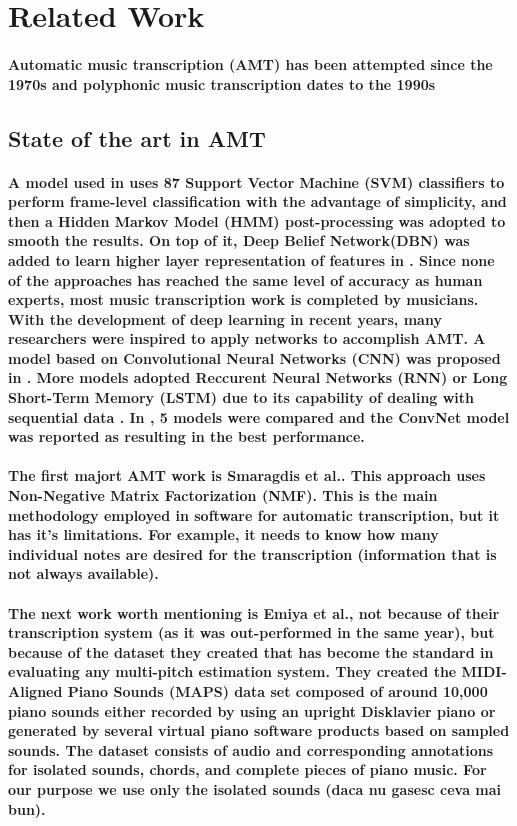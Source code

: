 \newpage
\section{Related Work}
\paragraph{
Automatic music transcription (AMT) has been attempted since the 1970s and polyphonic music transcription dates to the 1990s \cite{REF:1}
}

\subsection{State of the art in AMT}
\paragraph{
A model used in \cite{REF:2} uses 87 Support Vector Machine (SVM) classifiers to perform frame-level classification with the advantage of simplicity, and then a Hidden Markov Model (HMM) post-processing was adopted to smooth the results. On top of it, Deep Belief Network(DBN) was added to learn higher layer representation of features in \cite{REF:3}. Since none of the approaches has reached the same level of accuracy as human experts, most music transcription work is completed by musicians. With the development of deep learning in recent years, many researchers were inspired to apply networks to accomplish AMT. A model based on Convolutional Neural Networks (CNN) was proposed in \cite{REF:4}. More models adopted Reccurent Neural Networks (RNN) or Long Short-Term Memory (LSTM) due to its capability of dealing with sequential data \cite{REF:1} \cite{REF:5} \cite{REF:6}. In \cite{REF:7}, 5 models were compared and the ConvNet model was reported as resulting in the best performance.
}
\paragraph{
The first majort AMT work is Smaragdis et al.\cite{REF:8}. This approach uses Non-Negative Matrix Factorization (NMF). This is the main methodology employed in software for automatic transcription, but it has it's limitations. For example, it needs to know how many individual notes are desired for the transcription (information that is not always available).
}
\paragraph{
The next work worth mentioning is Emiya et al.\cite{REF:9}, not because of their transcription system (as it was out-performed in the same year), but because of the dataset they created that has become the standard in evaluating any multi-pitch estimation system. They created the MIDI-Aligned Piano Sounds (MAPS) data set composed of around 10,000 piano sounds either recorded by using an upright Disklavier piano or generated by several virtual piano software products based on sampled sounds. The dataset
consists of audio and corresponding annotations for isolated sounds, chords, and complete pieces of piano music. For our purpose we use only the isolated sounds (daca nu gasesc ceva mai bun).
}

